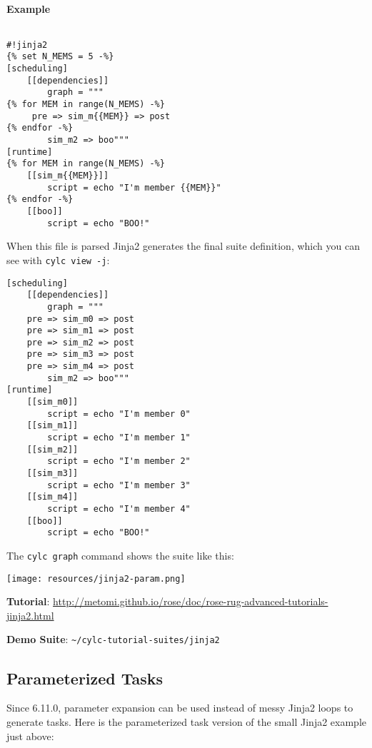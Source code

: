 \paragraph{Example} $ $

\begin{lstlisting}
#!jinja2
{% set N_MEMS = 5 -%}
[scheduling]
    [[dependencies]]
        graph = """
{% for MEM in range(N_MEMS) -%}
     pre => sim_m{{MEM}} => post
{% endfor -%}
        sim_m2 => boo"""
[runtime]
{% for MEM in range(N_MEMS) -%}
    [[sim_m{{MEM}}]]
        script = echo "I'm member {{MEM}}"
{% endfor -%}
    [[boo]]
        script = echo "BOO!"
\end{lstlisting}

When this file is parsed Jinja2 generates the final suite definition, which
you can see with \lstinline=cylc view -j=:
\begin{lstlisting}
[scheduling]
    [[dependencies]]
        graph = """
    pre => sim_m0 => post
    pre => sim_m1 => post
    pre => sim_m2 => post
    pre => sim_m3 => post
    pre => sim_m4 => post
        sim_m2 => boo"""
[runtime]
    [[sim_m0]]
        script = echo "I'm member 0"
    [[sim_m1]]
        script = echo "I'm member 1"
    [[sim_m2]]
        script = echo "I'm member 2"
    [[sim_m3]]
        script = echo "I'm member 3"
    [[sim_m4]]
        script = echo "I'm member 4"
    [[boo]]
        script = echo "BOO!"
\end{lstlisting}

The \lstinline=cylc graph= command shows the suite like this:
\begin{center}
\texttt{[image: resources/jinja2-param.png]}
\end{center}

\begin{shaded*}
\textbf{Tutorial}: \url{http://metomi.github.io/rose/doc/rose-rug-advanced-tutorials-jinja2.html}

\textbf{Demo Suite}: \lstinline=~/cylc-tutorial-suites/jinja2=
\end{shaded*}

\subsection{Parameterized Tasks}

Since 6.11.0, parameter expansion can be used instead of messy Jinja2 loops
to generate tasks. Here is the parameterized task version of the
small Jinja2 example just above:

